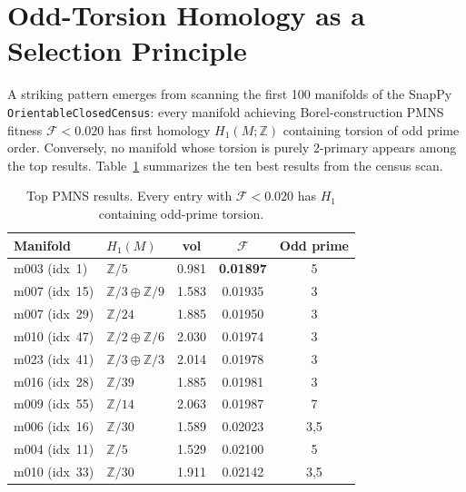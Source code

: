 ﻿%
\section{Odd-Torsion Homology as a Selection Principle}
\label{sec:homology}

A striking pattern emerges from scanning the first 100 manifolds of
the SnapPy \texttt{OrientableClosedCensus}: every manifold achieving
Borel-construction PMNS fitness $\mathcal{F} < 0.020$ has first
homology $H_1(M;\mathbb{Z})$ containing torsion of odd prime order.
Conversely, no manifold whose torsion is purely 2-primary appears
among the top results. Table~\ref{tab:homology_pattern} summarizes
the ten best results from the census scan.

\begin{table}[h]
\centering
\caption{Top PMNS results. Every entry with $\mathcal{F} < 0.020$
has $H_1$ containing odd-prime torsion.}
\label{tab:homology_pattern}
\begin{tabular}{llccc}
\toprule
Manifold & $H_1(M)$ & vol & $\mathcal{F}$ & Odd prime \\
\midrule
m003 (idx~1)  & $\mathbb{Z}/5$                     & 0.981 & \textbf{0.01897} & 5 \\
m007 (idx~15) & $\mathbb{Z}/3\oplus\mathbb{Z}/9$   & 1.583 & 0.01935 & 3 \\
m007 (idx~29) & $\mathbb{Z}/24$                    & 1.885 & 0.01950 & 3 \\
m010 (idx~47) & $\mathbb{Z}/2\oplus\mathbb{Z}/6$   & 2.030 & 0.01974 & 3 \\
m023 (idx~41) & $\mathbb{Z}/3\oplus\mathbb{Z}/3$   & 2.014 & 0.01978 & 3 \\
m016 (idx~28) & $\mathbb{Z}/39$                    & 1.885 & 0.01981 & 3 \\
m009 (idx~55) & $\mathbb{Z}/14$                    & 2.063 & 0.01987 & 7 \\
m006 (idx~16) & $\mathbb{Z}/30$                    & 1.589 & 0.02023 & 3,5 \\
m004 (idx~11) & $\mathbb{Z}/5$                     & 1.529 & 0.02100 & 5 \\
m010 (idx~33) & $\mathbb{Z}/30$                    & 1.911 & 0.02142 & 3,5 \\
\bottomrule
\end{tabular}
\end{table}

